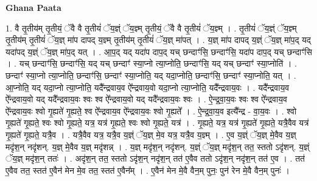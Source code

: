 \documentclass[17pt]{extarticle}
\begin{document}
\textbf{Ghana Paata } \newline

1. वै तृ॒तीय॑म् तृ॒तीयं॒ ॅवै वै तृ॒तीयं॑ ॅय॒ज्ञ्ं ॅय॒ज्ञ्म् तृ॒तीयं॒ ॅवै वै तृ॒तीयं॑ ॅय॒ज्ञ्म् । . तृ॒तीयं॑ ॅय॒ज्ञ्ं ॅय॒ज्ञ्म् तृ॒तीय॑म् तृ॒तीयं॑ ॅय॒ज्ञ् मा॑प दापद् य॒ज्ञ्म् तृ॒तीय॑म् तृ॒तीयं॑ ॅय॒ज्ञ् मा॑पत् । . य॒ज्ञ् मा॑प दापद् य॒ज्ञ्ं ॅय॒ज्ञ् मा॑प॒द् यद् यदा॑पद् य॒ज्ञ्ं ॅय॒ज्ञ् मा॑प॒द् यत् । . आ॒प॒द् यद् यदा॑प दाप॒द् यच् छन्दाꣳ॑सि॒ छन्दाꣳ॑सि॒ यदा॑प दाप॒द् यच् छन्दाꣳ॑सि । . यच् छन्दाꣳ॑सि॒ छन्दाꣳ॑सि॒ यद् यच् छन्दाꣳ॑ स्या॒प्नो त्या॒प्नोति॒ छन्दाꣳ॑सि॒ यद् यच् छन्दाꣳ॑ स्या॒प्नोति॑ । . छन्दाꣳ॑ स्या॒प्नो त्या॒प्नोति॒ छन्दाꣳ॑सि॒ छन्दाꣳ॑ स्या॒प्नोति॒ यद् यदा॒प्नोति॒ छन्दाꣳ॑सि॒ छन्दाꣳ॑ स्या॒प्नोति॒ यत् । . आ॒प्नोति॒ यद् यदा॒प्नो त्या॒प्नोति॒ यदै᳚न्द्रवाय॒व ऐ᳚न्द्रवाय॒वो यदा॒प्नो त्या॒प्नोति॒ यदै᳚न्द्रवाय॒वः । . यदै᳚न्द्रवाय॒व ऐ᳚न्द्रवाय॒वो यद् यदै᳚न्द्रवाय॒वः श्वः श्व ऐ᳚न्द्रवाय॒वो यद् यदै᳚न्द्रवाय॒वः श्वः । . ऐ॒न्द्र॒वा॒य॒वः श्वः श्व ऐ᳚न्द्रवाय॒व ऐ᳚न्द्रवाय॒वः श्वो गृ॒ह्यते॑ गृ॒ह्यते॒ श्व ऐ᳚न्द्रवाय॒व ऐ᳚न्द्रवाय॒वः श्वो गृ॒ह्यते᳚ । . ऐ॒न्द्र॒वा॒य॒व इत्यै᳚न्द्र - वा॒य॒वः । . श्वो गृ॒ह्यते॑ गृ॒ह्यते॒ श्वः श्वो गृ॒ह्यते॒ यत्र॒ यत्र॑ गृ॒ह्यते॒ श्वः श्वो गृ॒ह्यते॒ यत्र॑ । . गृ॒ह्यते॒ यत्र॒ यत्र॑ गृ॒ह्यते॑ गृ॒ह्यते॒ यत्रै॒वैव यत्र॑ गृ॒ह्यते॑ गृ॒ह्यते॒ यत्रै॒व । . यत्रै॒वैव यत्र॒ यत्रै॒व य॒ज्ञ्ं ॅय॒ज्ञ् मे॒व यत्र॒ यत्रै॒व य॒ज्ञ्म् । . ए॒व य॒ज्ञ्ं ॅय॒ज्ञ् मे॒वैव य॒ज्ञ् मदृ॑श॒न् नदृ॑शन्. य॒ज्ञ् मे॒वैव य॒ज्ञ् मदृ॑शन्न् । . य॒ज्ञ् मदृ॑श॒न् नदृ॑शन्. य॒ज्ञ्ं ॅय॒ज्ञ् मदृ॑श॒न् तत॒ स्ततो ऽदृ॑शन्. य॒ज्ञ्ं ॅय॒ज्ञ् मदृ॑श॒न् ततः॑ । . अदृ॑श॒न् तत॒ स्ततो ऽदृ॑श॒न् नदृ॑श॒न् तत॑ ए॒वैव ततो ऽदृ॑श॒न् नदृ॑श॒न् तत॑ ए॒व । . तत॑ ए॒वैव तत॒ स्तत॑ ए॒वैन॑ मेन मे॒व तत॒ स्तत॑ ए॒वैन᳚म् । . ए॒वैन॑ मेन मे॒वै वैन॒म् पुनः॒ पुन॑ रेन मे॒वै वैन॒म् पुनः॑ । \newline
\end{document}
